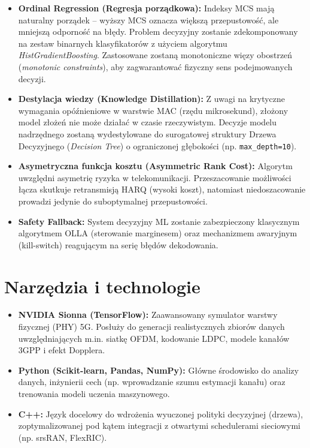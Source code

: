 \documentclass[12pt, a4paper]{article}
\begin{document}
\begin{itemize}
    \item \textbf{Ordinal Regression (Regresja porządkowa):} Indeksy MCS mają naturalny porządek -- wyższy MCS oznacza większą przepustowość, ale mniejszą odporność na błędy. Problem decyzyjny zostanie zdekomponowany na zestaw binarnych klasyfikatorów z użyciem algorytmu \textit{HistGradientBoosting}. Zastosowane zostaną monotoniczne więzy obostrzeń (\textit{monotonic constraints}), aby zagwarantować fizyczny sens podejmowanych decyzji.
    \item \textbf{Destylacja wiedzy (Knowledge Distillation):} Z uwagi na krytyczne wymagania opóźnieniowe w warstwie MAC (rzędu mikrosekund), złożony model złożeń nie może działać w czasie rzeczywistym. Decyzje modelu nadrzędnego zostaną wydestylowane do surogatowej struktury Drzewa Decyzyjnego (\textit{Decision Tree}) o ograniczonej głębokości (np. \texttt{max\_depth=10}).
    \item \textbf{Asymetryczna funkcja kosztu (Asymmetric Rank Cost):} Algorytm uwzględni asymetrię ryzyka w telekomunikacji. Przeszacowanie możliwości łącza skutkuje retransmisją HARQ (wysoki koszt), natomiast niedoszacowanie prowadzi jedynie do suboptymalnej przepustowości.
    \item \textbf{Safety Fallback:} System decyzyjny ML zostanie zabezpieczony klasycznym algorytmem OLLA (sterowanie marginesem) oraz mechanizmem awaryjnym (kill-switch) reagującym na serię błędów dekodowania.
\end{itemize}

\section{Narzędzia i technologie}
\begin{itemize}
    \item \textbf{NVIDIA Sionna (TensorFlow):} Zaawansowany symulator warstwy fizycznej (PHY) 5G. Posłuży do generacji realistycznych zbiorów danych uwzględniających m.in. siatkę OFDM, kodowanie LDPC, modele kanałów 3GPP i efekt Dopplera.
    \item \textbf{Python (Scikit-learn, Pandas, NumPy):} Główne środowisko do analizy danych, inżynierii cech (np. wprowadzanie szumu estymacji kanału) oraz trenowania modeli uczenia maszynowego.
    \item \textbf{C++:} Język docelowy do wdrożenia wyuczonej polityki decyzyjnej (drzewa), zoptymalizowanej pod kątem integracji z otwartymi schedulerami sieciowymi (np. srsRAN, FlexRIC).
\end{itemize}
\end{document}
